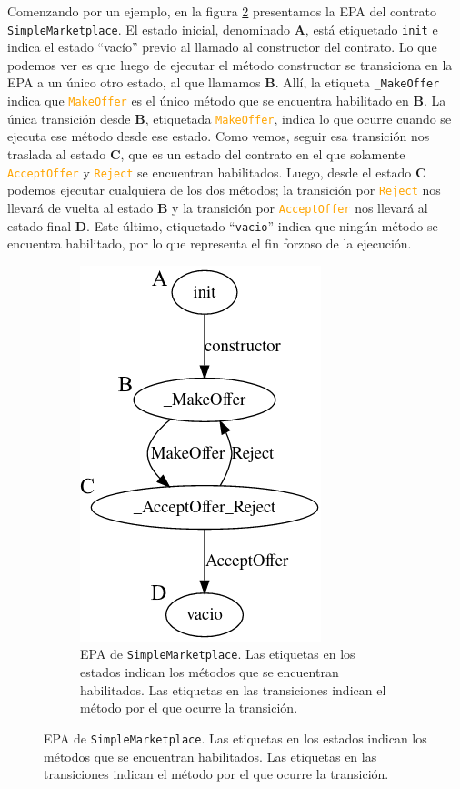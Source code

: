 Comenzando por un ejemplo, en la figura \ref{fig:epa-example} presentamos la EPA del contrato \texttt{Simple\-Marketplace}.
El estado inicial, denominado \textbf{A}, está etiquetado \texttt{init} e indica el estado ``vacío'' previo al llamado al constructor del contrato.
Lo que podemos ver es que luego de ejecutar el método constructor se transiciona en la EPA a un único otro estado, al que llamamos \textbf{B}.
Allí, la etiqueta \texttt{\_MakeOffer} indica que \textcolor{orange}{\texttt{MakeOffer}} es el único método que se encuentra habilitado en \textbf{B}.
La única transición desde \textbf{B}, etiquetada \textcolor{orange}{\texttt{MakeOffer}}, indica lo que ocurre cuando se ejecuta ese método desde ese estado. Como vemos, seguir esa transición nos traslada  al estado \textbf{C}, que es un estado del contrato en el que solamente \textcolor{orange}{\texttt{AcceptOffer}} y \textcolor{orange}{\texttt{Reject}} se encuentran habilitados.
Luego, desde el estado \textbf{C} podemos ejecutar cualquiera de los dos métodos; la transición por \textcolor{orange}{\texttt{Reject}} nos llevará de vuelta al estado \textbf{B} y la transición por \textcolor{orange}{\texttt{AcceptOffer}} nos llevará al estado final \textbf{D}.
Este último, etiquetado ``\texttt{vacio}'' indica que ningún método se encuentra habilitado, por lo que representa el fin forzoso de la ejecución.



\begin{figure}
    \centering
    \begin{subfigure}{0.45\textwidth}
        \includegraphics{figs/simple-merketplace-epa.png}
        \caption{EPA de \texttt{SimpleMarketplace}. Las etiquetas en los estados indican los métodos que se encuentran habilitados. Las etiquetas en las transiciones indican el método por el que ocurre la transición.}
        \label{fig:epa-example}
    \end{subfigure}
\end{figure}

